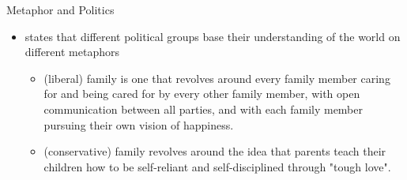 

\begin{frame}{Metaphor and Politics}

\begin{itemize}
\item \citet{Lakoff:1995} states that different political groups base their
  understanding of the world on different metaphors
  \begin{itemize}
  \item {} (liberal) family is one that revolves
    around every family member caring for and being cared for by every
    other family member, with open communication between all parties,
    and with each family member pursuing their own vision of
    happiness.
  \item {} (conservative) family revolves around the idea that parents teach their children how to be self-reliant and self-disciplined through "tough love". 
  \end{itemize}
\end{itemize}

\end{frame}

